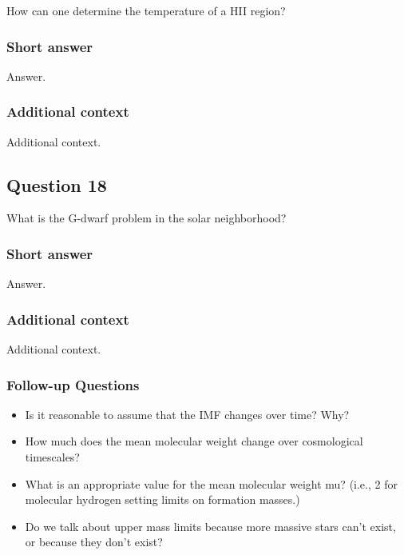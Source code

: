 \documentclass[a4paper,10pt]{article}
\begin{document}
How can one determine the temperature of a HII region?

\subsubsection{Short answer}

Answer.

\subsubsection{Additional context}

Additional context.


\newpage
\subsection{Question 18}

What is the G-dwarf problem in the solar neighborhood?

\subsubsection{Short answer}

Answer.

\subsubsection{Additional context}

Additional context.

\subsubsection{Follow-up Questions}

\begin{itemize}
    \item Is it reasonable to assume that the IMF changes over time? Why?
    \item How much does the mean molecular weight change over cosmological timescales?
    \item What is an appropriate value for the mean molecular weight mu? (i.e., 2 for molecular hydrogen setting limits on formation masses.)
    \item Do we talk about upper mass limits because more massive stars can't exist, or because they don't exist?
\end{itemize}
\end{document}
